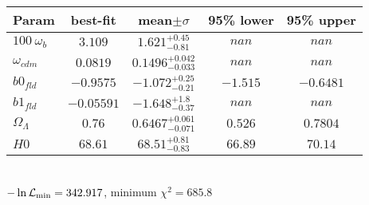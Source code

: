 \begin{tabular}{|l|c|c|c|c|} 
 \hline 
Param & best-fit & mean$\pm\sigma$ & 95\% lower & 95\% upper \\ \hline 
$100~\omega_{b }$ &$3.109$ & $1.621_{-0.81}^{+0.45}$ & $nan$ & $nan$ \\ 
$\omega_{cdm }$ &$0.0819$ & $0.1496_{-0.033}^{+0.042}$ & $nan$ & $nan$ \\ 
$b0_{fld }$ &$-0.9575$ & $-1.072_{-0.21}^{+0.25}$ & $-1.515$ & $-0.6481$ \\ 
$b1_{fld }$ &$-0.05591$ & $-1.648_{-0.37}^{+1.8}$ & $nan$ & $nan$ \\ 
$\Omega_{\Lambda }$ &$0.76$ & $0.6467_{-0.071}^{+0.061}$ & $0.526$ & $0.7804$ \\ 
$H0$ &$68.61$ & $68.51_{-0.83}^{+0.81}$ & $66.89$ & $70.14$ \\ 
\hline 
 \end{tabular} \\ 
$-\ln{\cal L}_\mathrm{min} =342.917$, minimum $\chi^2=685.8$ \\ 
